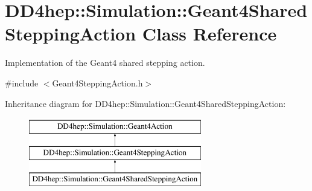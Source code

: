 \hypertarget{class_d_d4hep_1_1_simulation_1_1_geant4_shared_stepping_action}{}\section{D\+D4hep\+:\+:Simulation\+:\+:Geant4\+Shared\+Stepping\+Action Class Reference}
\label{class_d_d4hep_1_1_simulation_1_1_geant4_shared_stepping_action}


Implementation of the Geant4 shared stepping action.  




{\ttfamily \#include $<$Geant4\+Stepping\+Action.\+h$>$}

Inheritance diagram for D\+D4hep\+:\+:Simulation\+:\+:Geant4\+Shared\+Stepping\+Action\+:\begin{figure}[H]
\begin{center}
\leavevmode
\includegraphics[height=3.000000cm]{class_d_d4hep_1_1_simulation_1_1_geant4_shared_stepping_action}
\end{center}
\end{figure}
